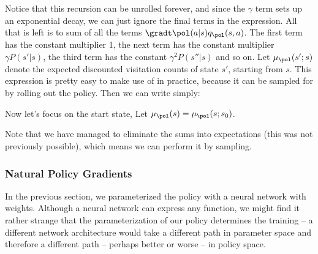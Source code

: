 \documentclass[12pt]{article}
\begin{document}

Notice that this recursion can be unrolled forever, and since the $\gamma$ term sets up an exponential decay, we can just ignore the final terms in the expression. All that is left is to sum of all the terms $\gradt \pol(a|s) q_{\pol}(s, a)$. The first term has the constant multiplier 1, the next term has the constant multiplier $\gamma P(s'|s)$, the third term has the constant $\gamma^2 P(s''|s)$ and so on. Let $\mu_{\pol}(s';s)$ denote the expected discounted visitation counts of state $s'$, starting from $s$. This expression is pretty easy to make use of in practice, because it can be sampled for by rolling out the policy. Then we can write simply:


Now let's focus on the start state, Let $\mu_{\pol}(s) = \mu_{\pol}(s;s_0)$.


Note that we have managed to eliminate the sums into expectations (this was not previously possible), which means we can perform it by sampling.

\subsubsection{Natural Policy Gradients}

In the previous section, we parameterized the policy with a neural network with weights. Although a neural network can express any function, we might find it rather strange that the parameterization of our policy determines the training -- a different network architecture would take a different path in parameter space and therefore a different path -- perhaps better or worse -- in policy space. 
\end{document}
